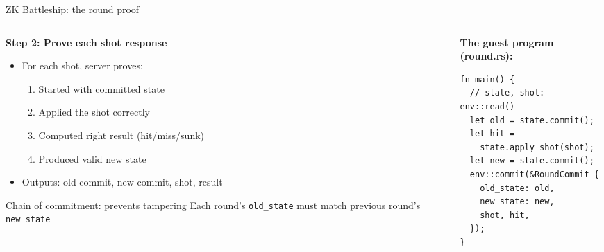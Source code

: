 \ifdefined\PRESENTATION\else\PassOptionsToClass{handout}{beamer}\fi\documentclass[aspectratio=169, lualatex]{beamer}
\begin{document}
\begin{frame}[fragile]{ZK Battleship: the round proof}
	\begin{columns}[c]
		\begin{column}{0.55\textwidth}
			\textbf{Step 2: Prove each shot response}
			\begin{itemize}
				\item For each shot, server proves:
				      \begin{enumerate}
					      \item Started with committed state
					      \item Applied the shot correctly
					      \item Computed right result (hit/miss/sunk)
					      \item Produced valid new state
				      \end{enumerate}
				\item Outputs: old commit, new commit, shot, result
			\end{itemize}
			\begin{alertblock}{Chain of commitment: prevents tampering}
				Each round's \texttt{old\_state} must match previous round's \texttt{new\_state}
			\end{alertblock}
		\end{column}
		\begin{column}{0.45\textwidth}
			\textbf{The guest program (round.rs):}
			\begin{verbatim}
fn main() {
  // state, shot: env::read()
  let old = state.commit();
  let hit =
    state.apply_shot(shot);
  let new = state.commit();
  env::commit(&RoundCommit {
    old_state: old,
    new_state: new,
    shot, hit,
  });
}
\end{verbatim}
		\end{column}
	\end{columns}
\end{frame}
\end{document}
